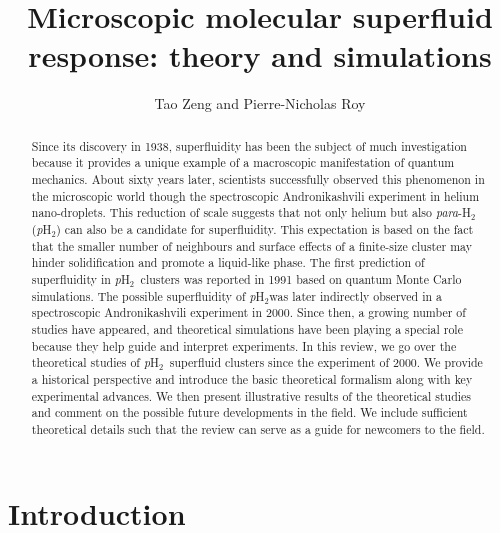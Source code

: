 \documentclass[12pt]{iopart}
\newcommand{\hydrogen}{H$_2$}
\newcommand{\phtwo}{{\em p}H$_2$}
\begin{document}
\title{Microscopic molecular superfluid response: theory and simulations}

\author{Tao Zeng and Pierre-Nicholas Roy}

\address{Department of Chemistry, University of Waterloo, Waterloo, Ontario N2L 3G1, Canada}

\begin{abstract}
Since its discovery in 1938, superfluidity has been the subject of much investigation because  it provides a unique example of a macroscopic manifestation of quantum mechanics. About sixty years later, scientists successfully observed this phenomenon in the microscopic world though the spectroscopic Andronikashvili experiment in helium nano-droplets. 
This reduction of scale suggests that not only helium but also {\em para}-\hydrogen (\phtwo) can also be a candidate for superfluidity.
This expectation is based on the fact that the smaller number of neighbours and surface effects of a finite-size cluster may hinder solidification and promote a liquid-like phase. The first prediction of superfluidity in \phtwo~clusters was reported in 1991 based on quantum Monte Carlo simulations.
The possible superfluidity of  \phtwo was later indirectly observed in a spectroscopic Andronikashvili experiment in 2000. 
Since then, a growing number of studies have appeared, and theoretical simulations have been playing a special role because they help guide and interpret  experiments. 
In this review, we go over the theoretical studies of \phtwo~superfluid clusters since the experiment of 2000. 
We provide a historical perspective and introduce the basic theoretical formalism along with key experimental advances.
We then present illustrative results of the theoretical studies and comment on the possible future developments in the field. 
We include sufficient theoretical details such that the review can serve as a guide for newcomers to the field.
\end{abstract}

\maketitle


\section{Introduction} \label{sec:intro}
\end{document}
